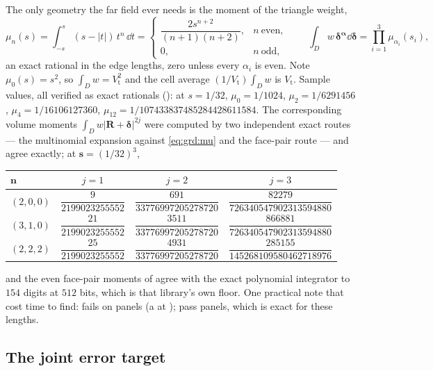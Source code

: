 The only geometry the far field ever needs is the moment of the triangle weight,
\begin{equation}
\mu_n(s) = \int_{-s}^{s}(s-|t|)\,t^n\,\dd t =
\begin{cases}\dfrac{2s^{n+2}}{(n+1)(n+2)}, & n\ \text{even},\\[4pt] 0, & n\ \text{odd},\end{cases}
\qquad
\int_D w\,\boldsymbol{\delta}^{\boldsymbol\alpha}\dd\boldsymbol\delta
= \prod_{i=1}^{3}\mu_{\alpha_i}(s_i),
\label{eq:grd:mu}
\end{equation}
an exact rational in the edge lengths, zero unless every $\alpha_i$ is even. Note
$\mu_0(s) = s^2$, so $\int_D w = V_{\mathrm{t}}^2$ and the cell average
$(1/V_{\mathrm{t}})\int_D w$ is $V_{\mathrm{t}}$. Sample values, all verified as exact
rationals (): at $s = 1/32$, $\mu_0 = 1/1024$, $\mu_2 = 1/6291456$,
$\mu_4 = 1/16106127360$, $\mu_{12} = 1/107433837485284428611584$. The corresponding volume
moments $\int_D w|\mathbf{R}+\boldsymbol\delta|^{2j}$ were computed by two independent exact
routes --- the multinomial expansion against \eqref{eq:grd:mu} and the face-pair route ---
and agree exactly; at $\mathbf{s} = (1/32)^3$,
\begin{center}\small
\begin{tabular}{@{}lccc@{}}
\toprule
$\mathbf{n}$ & $j = 1$ & $j = 2$ & $j = 3$\\
\midrule
$(2,0,0)$ & $\dfrac{9}{2199023255552}$ & $\dfrac{691}{33776997205278720}$
          & $\dfrac{82279}{726340547902313594880}$\\[6pt]
$(3,1,0)$ & $\dfrac{21}{2199023255552}$ & $\dfrac{3511}{33776997205278720}$
          & $\dfrac{866881}{726340547902313594880}$\\[6pt]
$(2,2,2)$ & $\dfrac{25}{2199023255552}$ & $\dfrac{4931}{33776997205278720}$
          & $\dfrac{285155}{145268109580462718976}$\\
\bottomrule
\end{tabular}
\end{center}
\noindent
and the even face-pair moments of  agree with the exact
polynomial integrator to $154$ digits at $512$ bits, which is that library's own floor. One
practical note that cost time to find:  fails on
 panels (a  at ); pass
 panels, which is exact for these lengths.

\subsection{The joint error target}
\label{sec:grd:tgt}

